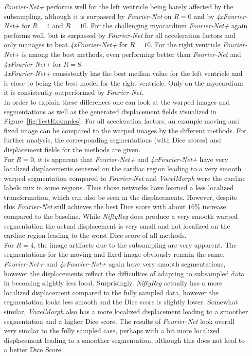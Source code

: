 \documentclass[english,version-2022-01]{uzl-thesis} %
\begin{document}
\emph{Fourier-Net+} performs well for the left ventricle being barely affected by the subsampling, although it is surpassed by \emph{Fourier-Net} on $R=0$ and by \emph{4xFourier-Net+} for $R=4$ and $R=10$. For the challenging myocardium \emph{Fourier-Net+} again performs well, but is surpassed by \emph{Fourier-Net} for all acceleration factors and only manages to beat \emph{4xFourier-Net+} for $R=10$. For the right ventricle \emph{Fourier-Net+} is among the best methods, even performing better than \emph{Fourier-Net} and \emph{4xFourier-Net+}  for $R=8$.\\
\emph{4xFourier-Net+} consistently has the best median value for the left ventricle and is close to being the best model for the right ventricle. Only on the myocardium it is consistently outperformed by \emph{Fourier-Net}.\\
In order to explain these differences one can look at the warped images and segmentations as well as the generated displacement fields visualized in Figure~\ref{fig:TestExamples}. For all acceleration factors, an example moving and fixed image can be compared to the warped images by the different methods. For further analysis, the corresponding segmentations (with Dice scores) and displacement fields for the methods are given.\\
For $R=0$, it is apparent that \emph{Fourier-Net+} and \emph{4xFourier-Net+} have very localized displacements centered on the cardiac region leading to a very smooth warped segmentation compared to \emph{Fourier-Net} and \emph{VoxelMorph} were the cardiac labels mix in some regions. Thus those networks have learned a less localized transformation, which can also be seen in the displacements. However, despite this \emph{Fourier-Net} still achieves the best Dice score with about $16\%$ increase compared to the baseline. While \emph{NiftyReg} does produce a very smooth warped segmentation the actual displacement is very small and not localized on the cardiac region leading to the worst Dice score of all methods.\\
For $R=4$, the image artifacts due to the subsampling are very apparent. The segmentations for the moving and fixed image obviously remain the same.
\emph{Fourier-Net+} and \emph{4xFourier-Net+} again have very smooth segmentations, however the displacements reflect the difficulties of adapting to subsampled data in becoming slightly less local. Surprisingly, \emph{NiftyReg} actually has a more localized displacement compared to the fully sampled data, however the segmentation looks less smooth and the Dice score is slightly lower. Somewhat similar, \emph{VoxelMorph} also has a more localized displacement leading to a smoother segmentation and a higher Dice score. The results of \emph{Fourier-Net} look overall very similar to the fully sampled case, perhaps with a bit more localized displacement leading to a smoother segmentation, although this does not lead to a better Dice Score.\\
\end{document}
